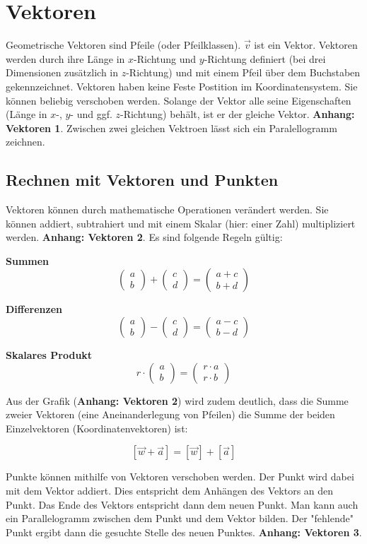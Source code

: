 \documentclass{article}
\newcommand{\m}[1]{\begin{pmatrix}#1\end{pmatrix}}
\begin{document}
    \section{Vektoren}

    Geometrische Vektoren sind Pfeile (oder Pfeilklassen). $\vec{v}$ ist ein Vektor.
    Vektoren werden durch ihre Länge in $x$-Richtung und $y$-Richtung definiert
    (bei drei Dimensionen zusätzlich in $z$-Richtung) und mit einem Pfeil über dem Buchstaben gekennzeichnet.
    Vektoren haben keine Feste Postition im Koordinatensystem. Sie können beliebig verschoben werden.
    Solange der Vektor alle seine Eigenschaften (Länge in $x$-, $y$- und ggf. $z$-Richtung) behält,
    ist er der gleiche Vektor. \textbf{Anhang: Vektoren 1}. Zwischen zwei gleichen Vektroen lässt sich ein
    Paralellogramm zeichnen.
    

    \subsection{Rechnen mit Vektoren und Punkten}
    Vektoren können durch mathematische Operationen verändert werden. 
    Sie können addiert, subtrahiert und mit einem Skalar (hier: einer Zahl) multipliziert werden.
    \textbf{Anhang: Vektoren 2}.
    Es sind folgende Regeln gültig:


    \textbf{Summen}
    \[
        \m{a \\ b} + \m{c \\ d} = \m{a+c \\ b+d}
    \]

    \textbf{Differenzen}
    \[
        \m{a \\ b} - \m{c \\ d} = \m{a-c \\ b-d}
    \]

    \textbf{Skalares Produkt}
    \[
        r \cdot \m{a \\ b} = \m{r \cdot a \\ r \cdot b}
    \]

    Aus der Grafik (\textbf{Anhang: Vektoren 2}) wird zudem deutlich, dass die Summe zweier Vektoren (eine Aneinanderlegung von Pfeilen)
    die Summe der beiden Einzelvektoren (Koordinatenvektoren) ist:

    \[
        [\vec{w} + \vec{a}] = [\vec{w}] + [\vec{a}]
    \]

    Punkte können mithilfe von Vektoren verschoben werden. Der Punkt wird dabei mit dem Vektor
    addiert. Dies entspricht dem Anhängen des Vektors an den Punkt. Das Ende des Vektors entspricht dann
    dem neuen Punkt. Man kann auch ein Parallelogramm zwischen dem Punkt und dem Vektor bilden. Der "fehlende"
    Punkt ergibt dann die gesuchte Stelle des neuen Punktes. \textbf{Anhang: Vektoren 3}.
\end{document}
